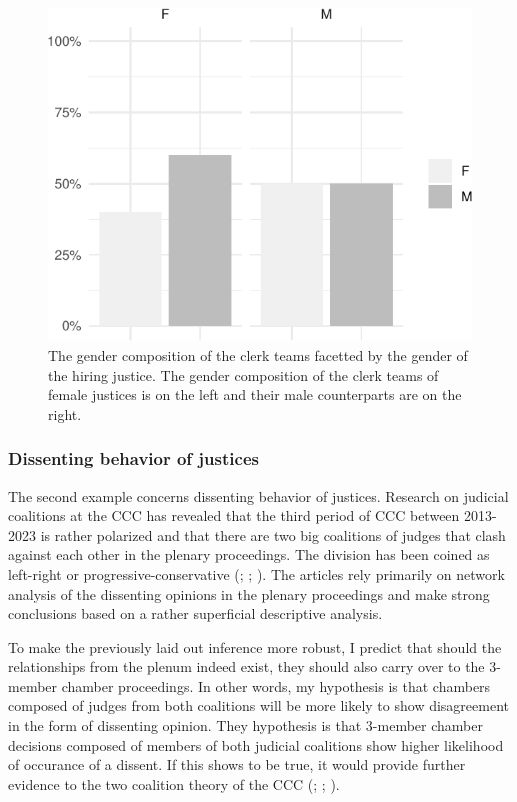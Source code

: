 \documentclass[
  11pt,
]{article}
\begin{document}
\begin{figure}
\centering
\includegraphics{The_Czech_Constitutional_Court_Database_files/figure-latex/gender-clerks-judges-1.pdf}
\caption{\label{fig:gender-clerks-judges}The gender composition of the clerk teams facetted by the gender of the hiring justice. The gender composition of the clerk teams of female justices is on the left and their male counterparts are on the right.}
\end{figure}

\subsubsection{Dissenting behavior of justices}\label{dissenting-behavior-of-justices}

The second example concerns dissenting behavior of justices. Research on judicial coalitions at the CCC has revealed that the third period of CCC between 2013-2023 is rather polarized and that there are two big coalitions of judges that clash against each other in the plenary proceedings. The division has been coined as left-right or progressive-conservative (; ; ). The articles rely primarily on network analysis of the dissenting opinions in the plenary proceedings and make strong conclusions based on a rather superficial descriptive analysis.

To make the previously laid out inference more robust, I predict that should the relationships from the plenum indeed exist, they should also carry over to the 3-member chamber proceedings. In other words, my hypothesis is that chambers composed of judges from both coalitions will be more likely to show disagreement in the form of dissenting opinion. They hypothesis is that 3-member chamber decisions composed of members of both judicial coalitions show higher likelihood of occurance of a dissent. If this shows to be true, it would provide further evidence to the two coalition theory of the CCC (; ; ).
\end{document}
